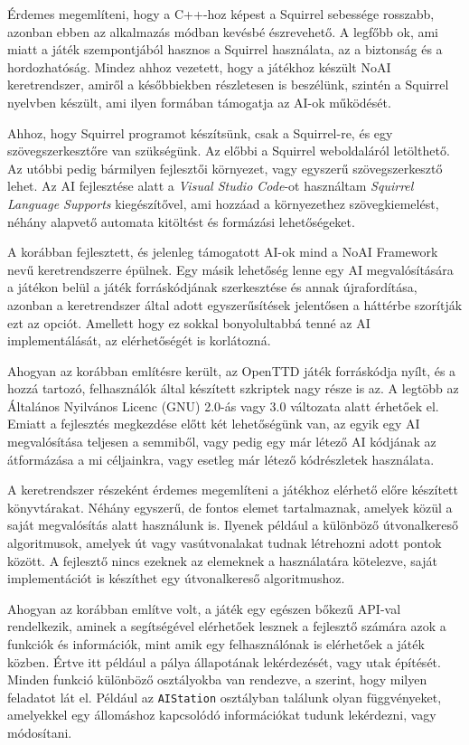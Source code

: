 Érdemes megemlíteni, hogy a C++-hoz képest a Squirrel sebessége rosszabb, azonban ebben az alkalmazás módban kevésbé észrevehető. A legfőbb ok, ami miatt a játék szempontjából hasznos a Squirrel használata, az a biztonság és a hordozhatóság. Mindez ahhoz vezetett, hogy a játékhoz készült NoAI keretrendszer, amiről a későbbiekben részletesen is beszélünk, szintén a Squirrel nyelvben készült, ami ilyen formában támogatja az AI-ok működését.

Ahhoz, hogy Squirrel programot készítsünk, csak a Squirrel-re, és egy szövegszerkesztőre van szükségünk. Az előbbi a Squirrel weboldaláról letölthető. Az utóbbi pedig bármilyen fejlesztői környezet, vagy egyszerű szövegszerkesztő lehet. Az AI fejlesztése alatt a \textit{Visual Studio Code}-ot használtam \textit{Squirrel Language Supports} kiegészítővel, ami hozzáad a környezethez szövegkiemelést, néhány alapvető automata kitöltést és formázási lehetőségeket.


A korábban fejlesztett, és jelenleg támogatott AI-ok mind a NoAI Framework nevű keretrendszerre épülnek. Egy másik lehetőség lenne egy AI megvalósítására a játékon belül a játék forráskódjának szerkesztése és annak újrafordítása, azonban a keretrendszer által adott egyszerűsítések jelentősen a háttérbe szorítják ezt az opciót. Amellett hogy ez sokkal bonyolultabbá tenné az AI implementálását, az elérhetőségét is korlátozná.

Ahogyan az korábban említésre került, az OpenTTD játék forráskódja nyílt, és a hozzá tartozó, felhasználók által készített szkriptek nagy része is az. A legtöbb az Általános Nyilvános Licenc (GNU) 2.0-ás vagy 3.0 változata alatt érhetőek el. Emiatt a fejlesztés megkezdése előtt két lehetőségünk van, az egyik egy AI megvalósítása teljesen a semmiből, vagy pedig egy már létező AI kódjának az átformázása a mi céljainkra, vagy esetleg már létező kódrészletek használata.

A keretrendszer részeként érdemes megemlíteni a játékhoz elérhető előre készített könyvtárakat. Néhány egyszerű, de fontos elemet tartalmaznak, amelyek közül a saját megvalósítás alatt használunk is. Ilyenek például a különböző útvonalkereső algoritmusok, amelyek út vagy vasútvonalakat tudnak létrehozni adott pontok között. A fejlesztő nincs ezeknek az elemeknek a használatára kötelezve, saját implementációt is készíthet egy útvonalkereső algoritmushoz.


Ahogyan az korábban említve volt, a játék egy egészen bőkezű API-val rendelkezik, aminek a segítségével elérhetőek lesznek a fejlesztő számára azok a funkciók és információk, mint amik egy felhasználónak is elérhetőek a játék közben. Értve itt például a pálya állapotának lekérdezését, vagy utak építését. Minden funkció különböző osztályokba van rendezve, a szerint, hogy milyen feladatot lát el. Például az \texttt{AIStation} osztályban találunk olyan függvényeket, amelyekkel egy állomáshoz kapcsolódó információkat tudunk lekérdezni, vagy módosítani.

